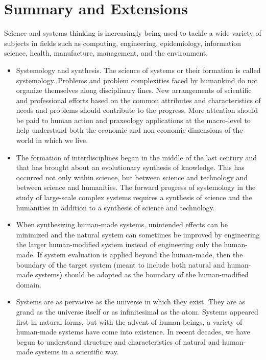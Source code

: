 \section{Summary and Extensions}

Science and systems thinking is increasingly being used to tackle a wide variety of subjects in fields such as computing, engineering, epidemiology, information science, health, manufacture, management, and the environment.

\begin{itemize}
\item Systemology and synthesis. The science of systems or their formation is called systemology. Problems and problem complexities faced by humankind do not organize themselves along disciplinary lines. New arrangements of scientific and professional efforts based on the common attributes and characteristics of needs and problems should contribute to the progress. More attention should be paid to human action and praxeology applications at the macro-level to help understand both the economic and non-economic dimensions of the world in which we live.
\item The formation of interdisciplines began in the middle of the last century and that has brought about an evolutionary synthesis of knowledge. This has occurred not only within science, but between science and technology and between science and humanities. The forward progress of systemology in the study of large-scale complex systems requires a synthesis of science and the humanities in addition to a synthesis of science and technology.
\item When synthesizing human-made systems, unintended effects can be minimized and the natural system can sometimes be improved by engineering the larger human-modified system instead of engineering only the human-made. If system evaluation is applied beyond the human-made, then the boundary of the target system (meant to include both natural and human-made systems) should be adopted as the boundary of the human-modified domain.
\item Systems are as pervasive as the universe in which they exist. They are as grand as the universe itself or as infinitesimal as the atom. Systems appeared first in natural forms, but with the advent of human beings, a variety of human-made systems have come into existence. In recent decades, we have begun to understand structure and characteristics of natural and human-made systems in a scientific way.
\end{itemize}

